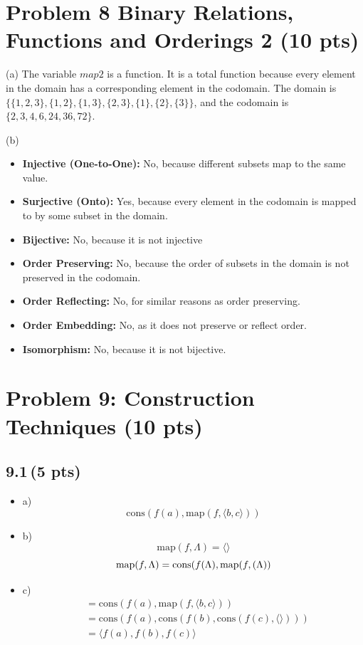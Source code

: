\documentclass[12pt]{article}
\begin{document}
\newpage
\section*{Problem 8 Binary Relations, Functions and Orderings 2 (10
pts)}
(a) The variable \(map2\) is a function. It is a total function because every element in the domain has a corresponding element in the codomain. The domain is \(\{\{1,2,3\}, \{1,2\}, \{1,3\}, \{2,3\}, \{1\}, \{2\}, \{3\}\}\), and the codomain is \(\{2, 3, 4, 6, 24, 36, 72\}\).

(b) 
\begin{itemize}
       \item \textbf{Injective (One-to-One):} No, because different subsets map to the same value.
       \item \textbf{Surjective (Onto):} Yes, because every element in the codomain is mapped to by some subset in the domain.
       \item \textbf{Bijective:} No, because it is not injective
       \item \textbf{Order Preserving:} No, because the order of subsets in the domain is not preserved in the codomain.
       \item \textbf{Order Reflecting:} No, for similar reasons as order preserving.
       \item \textbf{Order Embedding:} No, as it does not preserve or reflect order.
       \item \textbf{Isomorphism:} No, because it is not bijective.
\end{itemize}


\newpage
\section*{Problem 9: Construction Techniques (10 pts)}

\subsection*{9.1\,(5 pts)}
\begin{itemize}
    \item a) 
    \begin{equation*}
    \text{cons}(f(a), \text{map}(f, \langle b, c \rangle))
    \end{equation*}
    \item b)
    \begin{equation*}
    \text{map}(f, \Lambda) = \langle \rangle
    \end{equation*}
    \begin{equation*}
    \text{map}(f, \Lambda) = \text{cons}(f(\Lambda), \text{map}(f, \text(\Lambda))
    \end{equation*}
    \item c)
    \begin{align*}
    &= \text{cons}(f(a), \text{map}(f, \langle b, c \rangle)) \\
    &= \text{cons}(f(a), \text{cons}(f(b), \text{cons}(f(c), \langle \rangle))) \\
    &= \langle f(a), f(b), f(c) \rangle
\end{align*}
    
\end{itemize}
\end{document}

